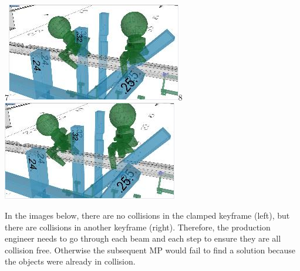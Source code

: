 \documentclass[11pt]{book}
\begin{document}
{\footnotesize 7}\includegraphics[width=7.64cm,height=4.3cm]{./images/image52.jpeg}{\footnotesize 8}\includegraphics[width=7.64cm,height=4.32cm]{./images/image53.jpeg}

In the images below, there are no collisions in the clamped keyframe (left), but there are collisions in another keyframe (right). Therefore, the production engineer needs to go through each beam and each step to ensure they are all collision free. Otherwise the subsequent MP would fail to find a solution because the objects were already in collision. 
\end{document}
